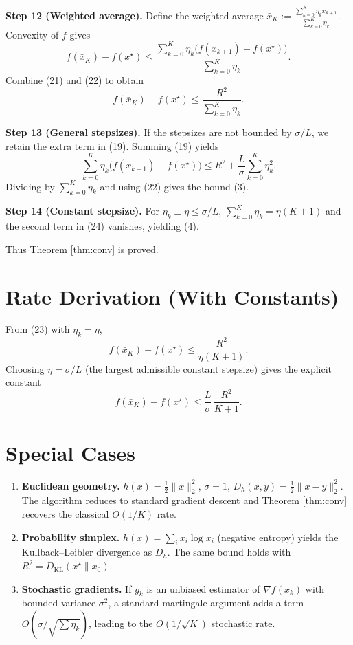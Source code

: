 \documentclass[11pt]{article}
\newcommand{\grad}{\nabla}
\newcommand{\D}{D_{h}}
\begin{document}
\medskip
\noindent\textbf{Step 12 (Weighted average).}  
Define the weighted average $\bar{x}_{K}:=\frac{\sum_{k=0}^{K}\eta_{k}x_{k+1}}{\sum_{k=0}^{K}\eta_{k}}$.  
Convexity of $f$ gives
\[
f(\bar{x}_{K})-f(x^{\star})
\le \frac{\sum_{k=0}^{K}\eta_{k}\big(f(x_{k+1})-f(x^{\star})\big)}
          {\sum_{k=0}^{K}\eta_{k}}.
\tag{22}
\]
Combine (21) and (22) to obtain
\[
f(\bar{x}_{K})-f(x^{\star})
\le \frac{R^{2}}{\displaystyle\sum_{k=0}^{K}\eta_{k}}.
\tag{23}
\]

\medskip
\noindent\textbf{Step 13 (General stepsizes).}  
If the stepsizes are not bounded by $\sigma/L$, we retain the extra term in (19). Summing (19) yields
\[
\sum_{k=0}^{K}\eta_{k}\big(f(x_{k+1})-f(x^{\star})\big)
 \le R^{2}
   +\frac{L}{\sigma}\sum_{k=0}^{K}\eta_{k}^{2}.
\tag{24}
\]
Dividing by $\sum_{k=0}^{K}\eta_{k}$ and using (22) gives the bound (3).

\medskip
\noindent\textbf{Step 14 (Constant stepsize).}  
For $\eta_{k}\equiv\eta\le\sigma/L$, $\sum_{k=0}^{K}\eta_{k}=\eta(K+1)$ and the second term in (24) vanishes, yielding (4).

Thus Theorem \ref{thm:conv} is proved. \hfill\qedsymbol

\section*{Rate Derivation (With Constants)}
From (23) with $\eta_{k}=\eta$,
\[
f(\bar{x}_{K})-f(x^{\star})\le\frac{R^{2}}{\eta(K+1)}.
\]
Choosing $\eta=\sigma/L$ (the largest admissible constant stepsize) gives the explicit constant
\[
f(\bar{x}_{K})-f(x^{\star})\le\frac{L}{\sigma}\,\frac{R^{2}}{K+1}.
\]

\section*{Special Cases}
\begin{enumerate}
\item \textbf{Euclidean geometry.} $h(x)=\tfrac12\|x\|_{2}^{2}$, $\sigma=1$, $\D(x,y)=\tfrac12\|x-y\|_{2}^{2}$. The algorithm reduces to standard gradient descent and Theorem \ref{thm:conv} recovers the classical $O(1/K)$ rate.
\item \textbf{Probability simplex.} $h(x)=\sum_{i}x_{i}\log x_{i}$ (negative entropy) yields the Kullback–Leibler divergence as $\D$. The same bound holds with $R^{2}=D_{\mathrm{KL}}(x^{\star}\|x_{0})$.
\item \textbf{Stochastic gradients.} If $g_{k}$ is an unbiased estimator of $\grad f(x_{k})$ with bounded variance $\sigma^{2}$, a standard martingale argument adds a term $O(\sigma/\sqrt{\sum\eta_{k}})$, leading to the $O(1/\sqrt{K})$ stochastic rate.
\end{enumerate}
\end{document}
